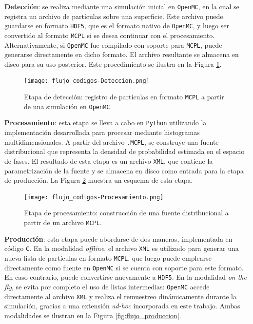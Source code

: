 \textbf{Detección}: se realiza mediante una simulación inicial en \texttt{OpenMC}, en la cual se registra un archivo de partículas sobre una superficie. Este archivo puede guardarse en formato \texttt{HDF5}, que es el formato nativo de \texttt{OpenMC}, y luego ser convertido al formato \texttt{MCPL} si se desea continuar con el procesamiento. Alternativamente, si \texttt{OpenMC} fue compilado con soporte para \texttt{MCPL}, puede generarse directamente en dicho formato. El archivo resultante se almacena en disco para su uso posterior. Este procedimiento se ilustra en la Figura \ref{fig:flujo_deteccion}.

\begin{figure}[H]
    \centering
    \texttt{[image: flujo\_codigos-Deteccion.png]}
    \caption{Etapa de detección: registro de partículas en formato \texttt{MCPL} a partir de una simulación en \texttt{OpenMC}.}
    \label{fig:flujo_deteccion}
\end{figure}

\textbf{Procesamiento}: esta etapa se lleva a cabo en \texttt{Python} utilizando la implementación desarrollada para procesar mediante histogramas multidimensionales. A partir del archivo \texttt{.MCPL}, se construye una fuente distribucional que representa la densidad de probabilidad estimada en el espacio de fases. El resultado de esta etapa es un archivo \texttt{XML}, que contiene la parametrización de la fuente y se almacena en disco como entrada para la etapa de producción. La Figura \ref{fig:flujo_procesamiento} muestra un esquema de esta etapa.

\begin{figure}[H]
    \centering
    \texttt{[image: flujo\_codigos-Procesamiento.png]}
    \caption{Etapa de procesamiento: construcción de una fuente distribucional a partir de un archivo \texttt{MCPL}.}
    \label{fig:flujo_procesamiento}
\end{figure}

\textbf{Producción}: esta etapa puede abordarse de dos maneras, implementada en código \texttt{C}. En la modalidad \textit{offline}, el archivo \texttt{XML} es utilizado para generar una nueva lista de partículas en formato \texttt{MCPL}, que luego puede emplearse directamente como fuente en \texttt{OpenMC} si se cuenta con soporte para este formato. En caso contrario, puede convertirse nuevamente a \texttt{HDF5}. En la modalidad \textit{on-the-fly}, se evita por completo el uso de listas intermedias: \texttt{OpenMC} accede directamente al archivo \texttt{XML} y realiza el remuestreo dinámicamente durante la simulación, gracias a una extensión \emph{ad-hoc} incorporada en este trabajo. Ambas modalidades se ilustran en la Figura \ref{fig:flujo_produccion}.

